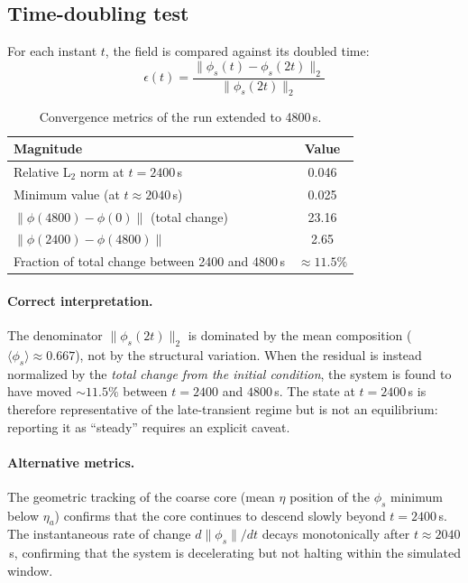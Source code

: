 \documentclass[12pt, a4paper]{article}
\begin{document}
\subsection*{Time-doubling test}

For each instant $t$, the field is compared against its doubled time:
\[
    \epsilon(t) = \frac{\|\phi_s(t) - \phi_s(2t)\|_2}{\|\phi_s(2t)\|_2}
\]

\begin{table}[H]
    \centering
    \begin{tabular}{lc}
        \toprule
        Magnitude & Value \\
        \midrule
        Relative L$_2$ norm at $t = 2400$\,s & 0.046 \\
        Minimum value (at $t \approx 2040$\,s) & 0.025 \\
        $\|\phi(4800) - \phi(0)\|$ (total change) & 23.16 \\
        $\|\phi(2400) - \phi(4800)\|$ & 2.65 \\
        Fraction of total change between 2400 and 4800\,s & $\approx 11.5\%$ \\
        \bottomrule
    \end{tabular}
    \caption{Convergence metrics of the run extended to 4800\,s.}
    \label{tab:estab}
\end{table}

\paragraph{Correct interpretation.}
The denominator $\|\phi_s(2t)\|_2$ is dominated by the mean composition
($\langle\phi_s\rangle \approx 0.667$), not by the structural variation.
When the residual is instead normalized by the \emph{total change from
the initial condition}, the system is found to have moved
$\sim 11.5\%$ between $t = 2400$ and $4800$\,s. The state at $t = 2400$\,s
is therefore representative of the late-transient regime but is not an
equilibrium: reporting it as ``steady'' requires an explicit caveat.

\paragraph{Alternative metrics.}
The geometric tracking of the coarse core (mean $\eta$ position of the
$\phi_s$ minimum below $\eta_a$) confirms that the core continues to
descend slowly beyond $t = 2400$\,s. The instantaneous rate of change
$d\|\phi_s\|/dt$ decays monotonically after $t \approx 2040$\,s,
confirming that the system is decelerating but not halting within the
simulated window.
\end{document}
